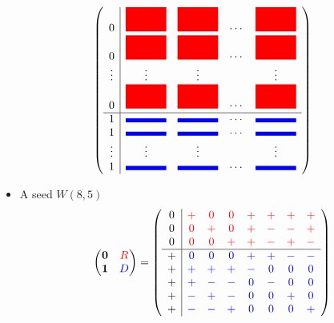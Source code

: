 \documentclass{beamer}
\newcommand{\RR}[1]{\textcolor{red}{#1}}
\newcommand{\BB}[1]{\textcolor{blue}{#1}}
\begin{document}
{
\newcommand{\rbox}{\RR{\mbox{\rule{0.5in}{0.3in}}}}
\newcommand{\bbox}{\BB{\mbox{\rule{0.5in}{0.05in}}}}

\begin{frame}

  \[
    \left(
      \begin{array}{c|cccc}
        0 & \rbox & \rbox & \cdots & \rbox \\
        0 & \rbox & \rbox & \cdots & \rbox \\
        \vdots & \vdots & \vdots &  & \vdots \\
        0 & \rbox & \rbox & \cdots & \rbox \\ \hline
        1 & \bbox & \bbox & \cdots & \bbox \\
        1 & \bbox & \bbox & \cdots & \bbox \\
        \vdots & \vdots & \vdots &  & \vdots \\
        1 & \bbox & \bbox & \cdots & \bbox \\
      \end{array}
    \right)
  \]
  
\end{frame}
}

\begin{frame}

  \begin{itemize}
  \item A seed $W(8,5)$
    \[
      \begin{pmatrix}
        \textbf{0} & \RR{R} \\
        \textbf{1} & \BB{D}
      \end{pmatrix}
      =
      \left(
        \begin{array}{c|ccccccc}
          0&\RR{+}&\RR{0}&\RR{0}&\RR{+}&\RR{+}&\RR{+}&\RR{+}\\
          0&\RR{0}&\RR{+}&\RR{0}&\RR{+}&\RR{-}&\RR{-}&\RR{+}\\
          0&\RR{0}&\RR{0}&\RR{+}&\RR{+}&\RR{-}&\RR{+}&\RR{-}\\ \hline
          +&\BB{0}&\BB{0}&\BB{0}&\BB{+}&\BB{+}&\BB{-}&\BB{-}\\
          +&\BB{+}&\BB{+}&\BB{+}&\BB{-}&\BB{0}&\BB{0}&\BB{0}\\
          +&\BB{+}&\BB{-}&\BB{-}&\BB{0}&\BB{-}&\BB{0}&\BB{0}\\
          +&\BB{-}&\BB{+}&\BB{-}&\BB{0}&\BB{0}&\BB{+}&\BB{0}\\
          +&\BB{-}&\BB{-}&\BB{+}&\BB{0}&\BB{0}&\BB{0}&\BB{+}\\
        \end{array}
      \right)
    \]
  \end{itemize}
  
\end{frame}
\end{document}
